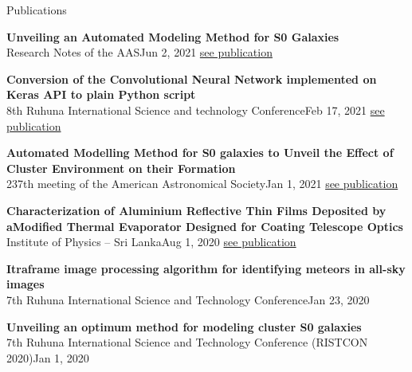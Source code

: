 \documentclass[
	11pt, %
]{./assets/resume} %
\begin{document}



\begin{rSection}{Publications}

	\textbf{Unveiling an Automated Modeling Method for S0 Galaxies} \\
	{Research Notes of the AAS}{Jun 2, 2021}
	\href{https://iopscience.iop.org/article/10.3847/2515-5172/ac0dc0}{see publication}

	\textbf{Conversion of the Convolutional Neural Network implemented on Keras API to plain Python script} \\
	{8th Ruhuna International Science and technology Conference}{Feb 17, 2021}
	\href{https://www.researchgate.net/publication/360994589_Conversion_of_the_Convolutional_Neural_Network_implemented_on_Keras_API_to_plain_Python_script}{see publication}

	\textbf{Automated Modelling Method for S0 galaxies to Unveil the Effect of Cluster Environment on their Formation} \\
	{237th meeting of the American Astronomical Society}{Jan 1, 2021}
	\href{https://www.researchgate.net/publication/348993949_Automated_Modelling_Method_for_S0_galaxies_to_Unveil_the_Effect_of_Cluster_Environment_on_their_Formation}{see publication}
	
	\textbf{Characterization of Aluminium Reflective Thin Films Deposited by aModified Thermal Evaporator Designed for Coating Telescope Optics} \\
	{Institute of Physics – Sri Lanka}{Aug 1, 2020}
	\href{https://www.researchgate.net/publication/344312143_Characterization_of_Aluminium_Reflective_Thin_Films_Deposited_by_a_Modified_Thermal_Evaporator_Designed_for_Coating_Telescope_Optics}{see publication}

	\textbf{Itraframe image processing algorithm for identifying meteors in all-sky images} \\
	{7th Ruhuna International Science and Technology Conference}{Jan 23, 2020}

	\textbf{Unveiling an optimum method for modeling cluster S0 galaxies} \\
	{7th Ruhuna International Science and Technology Conference (RISTCON 2020)}{Jan 1, 2020}


\end{rSection}
\end{document}
